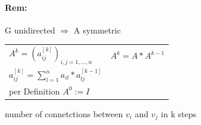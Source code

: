 \paragraph*{Rem:}
G unidirected $\Rightarrow$ A symmetric

\vspace{12pt}

\begin{tabular}{l l}
$A^k = (a_{ij}^{[k]})_{i,j = 1,\ldots , n}$ &

$A^k =A * A^{k-1}$ \\

$a_{ij}^{[k]} = \sum_{l=1}^n a_{il} * a_{lj}^{[k-1]} $ \\

per Definition $A^0 := I$ \\

\end{tabular}

number of connetctions between $v_i$ and $v_j$ in k steps

